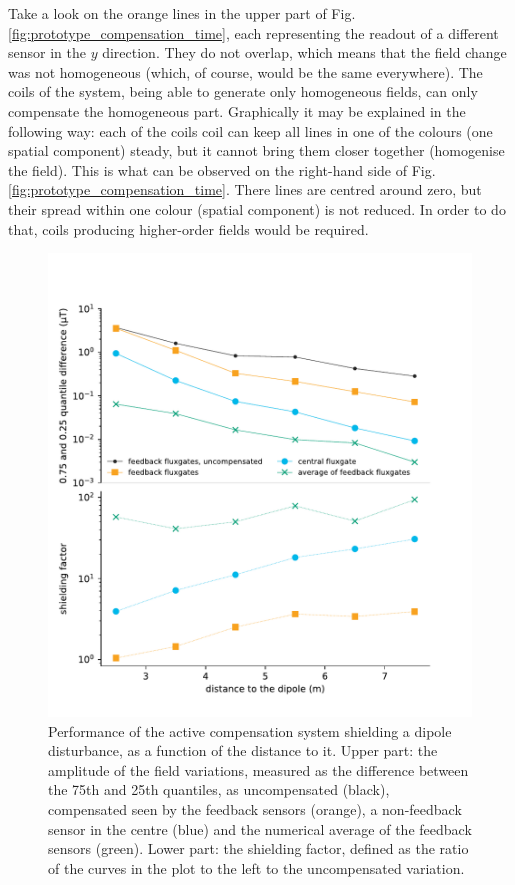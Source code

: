 Take a look on the orange lines in the upper part of Fig.\,\ref{fig:prototype_compensation_time}, each representing the readout of a different sensor in the $y$ direction. They do not overlap, which means that the field change was not homogeneous (which, of course, would be the same everywhere). The coils of the system, being able to generate only homogeneous fields, can only compensate the homogeneous part. Graphically it may be explained in the following way: each of the coils coil can keep all lines in one of the colours (one spatial component) steady, but it cannot bring them closer together (homogenise the field). This is what can be observed on the right-hand side of Fig.\,\ref{fig:prototype_compensation_time}. There lines are centred around zero, but their spread within one colour (spatial component) is not reduced. In order to do that, coils producing higher-order fields would be required.

\begin{figure}
  \centering
  \includegraphics[width=0.85\linewidth]{gfx/prototype/big_magnet_performance_shielding_factor.pdf}
  \caption{Performance of the active compensation system shielding a dipole disturbance, as a function of the distance to it. Upper part: the amplitude of the field variations, measured as the difference between the 75th and 25th quantiles, as uncompensated (black), compensated seen by the feedback sensors (orange), a non-feedback sensor in the centre (blue) and the numerical average of the feedback sensors (green). Lower part: the shielding factor, defined as the ratio of the curves in the plot to the left to the uncompensated variation.}\label{fig:prototype_compensation}
\end{figure}


